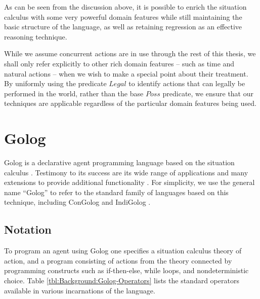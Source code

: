 As can be seen from the discussion above, it is possible to enrich
the situation calculus with some very powerful domain features while
still maintaining the basic structure of the language, as well as
retaining regression as an effective reasoning technique.

While we assume concurrent actions are in use through the rest of
this thesis, we shall only refer explicitly to other rich domain features
-- such as time and natural actions -- when we wish to make a special
point about their treatment. By uniformly using the predicate $Legal$
to identify actions that can legally be performed in the world, rather
than the base $Poss$ predicate, we ensure that our techniques are
applicable regardless of the particular domain features being used.


\section{Golog\label{sec:Background:Golog}}

Golog is a declarative agent programming language based on the situation
calculus \citep{levesque97golog}. Testimony to its success are its
wide range of applications and many extensions to provide additional
functionality \citep{giacomo00congolog,giacomo99indigolog,Ferrein2005readylog}.
For simplicity, we use the general name {}``Golog'' to refer to
the standard family of languages based on this technique, including
ConGolog \citep{giacomo00congolog} and IndiGolog \citep{giacomo99indigolog}.


\subsection{Notation}

To program an agent using Golog one specifies a situation calculus
theory of action, and a program consisting of actions from the theory
connected by programming constructs such as if-then-else, while loops,
and nondeterministic choice. Table \ref{tbl:Background:Golog-Operators}
lists the standard operators available in various incarnations of
the language.

